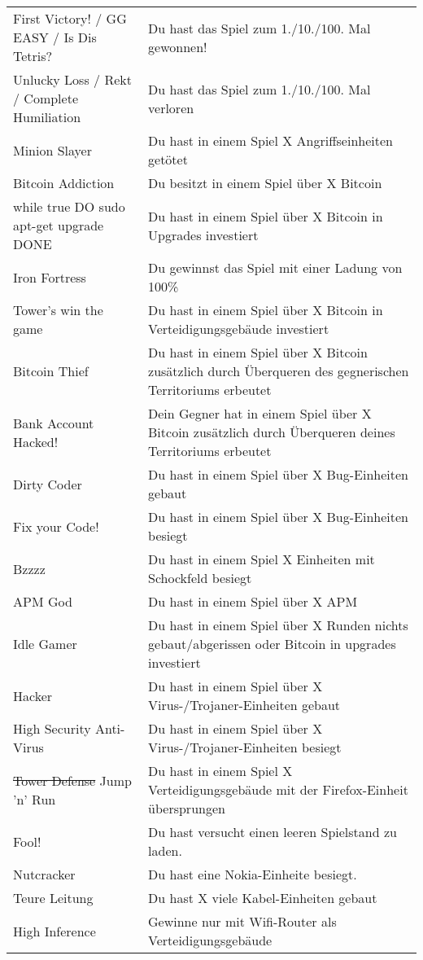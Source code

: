 \begin{longtabu}{X[0.7]X}
    First Victory! / GG EASY / Is Dis Tetris?
      & Du hast das Spiel zum 1./10./100. Mal gewonnen!
      	\\
    Unlucky Loss / Rekt / Complete Humiliation
    	& Du hast das Spiel zum 1./10./100. Mal verloren
    	\\
	Minion Slayer
		& Du hast in einem Spiel X Angriffseinheiten getötet
		\\
	Bitcoin Addiction
		& Du besitzt in einem Spiel über X Bitcoin
		\\
	while true DO sudo apt-get upgrade DONE
		& Du hast in einem Spiel über X Bitcoin in Upgrades investiert
		\\
	Iron Fortress
		& Du gewinnst das Spiel mit einer Ladung von 100\%
		\\
	Tower's win the game
		& Du hast in einem Spiel über X Bitcoin in Verteidigungsgebäude investiert
		\\
	Bitcoin Thief
		& Du hast in einem Spiel über X Bitcoin zusätzlich durch Überqueren des gegnerischen
		Territoriums erbeutet
		\\
	Bank Account Hacked!
		& Dein Gegner hat in einem Spiel über X Bitcoin zusätzlich durch Überqueren deines
		Territoriums erbeutet
		\\
	Dirty Coder
		& Du hast in einem Spiel über X Bug-Einheiten gebaut
		\\
	Fix your Code!
		& Du hast in einem Spiel über X Bug-Einheiten besiegt
		\\
	Bzzzz
		& Du hast in einem Spiel X Einheiten mit Schockfeld besiegt
		\\
	APM God
		& Du hast in einem Spiel über X APM
		\\
	Idle Gamer
		& Du hast in einem Spiel über X Runden nichts gebaut/abgerissen oder Bitcoin in upgrades investiert
		\\
	Hacker
		& Du hast in einem Spiel über X Virus-/Trojaner-Einheiten gebaut
		\\
	High Security Anti-Virus
		& Du hast in einem Spiel über X Virus-/Trojaner-Einheiten besiegt
		\\
	\st{Tower Defense} Jump 'n' Run
		& Du hast in einem Spiel X Verteidigungsgebäude mit der Firefox-Einheit übersprungen
		\\
	Fool!
		& Du hast versucht einen leeren Spielstand zu laden.
		\\
	Nutcracker
		& Du hast eine Nokia-Einheite besiegt.
		\\
	Teure Leitung
		& Du hast X viele Kabel-Einheiten gebaut
		\\
	High Inference
		& Gewinne nur mit Wifi-Router als Verteidigungsgebäude
		\\
    \bottomrule
  \end{longtabu}
\endgroup
